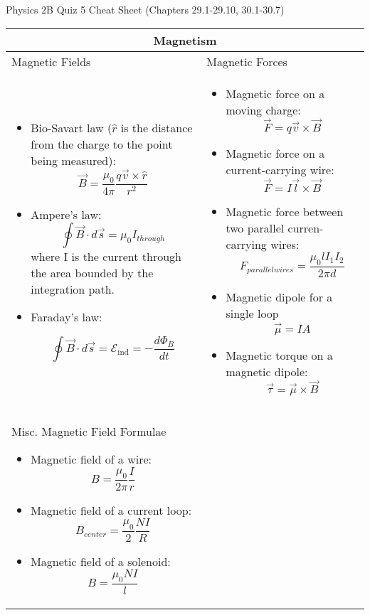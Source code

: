 \documentclass{article}
\begin{document}
\LARGE Physics 2B Quiz 5 Cheat Sheet (Chapters 29.1-29.10, 30.1-30.7)

\hrulefill
\normalsize

\begin{center}
	\begin{tabular}{|p{8cm}|p{8cm}|}
		\hline
		\multicolumn{2}{|c|}{Magnetism}                                                     \\
		\hline

		Magnetic Fields & Magnetic Forces                                                   \\

		\begin{itemize}
			\item Bio-Savart law ($ \hat{r}$ is the distance from the charge to the point being measured):
			      \[ \vec{B} = \frac{\mu_0}{4\pi} \frac{q\vec{v} \times \hat{r}}{r^2} \]
			\item Ampere's law:
			      \[ \oint \vec{B} \cdot d \vec{s} = \mu_0 I_{through} \]
			      where I is the current through the area bounded by the integration path.

			\item Faraday's law:

			      \[ \oint \vec B \cdot d \vec s = \mathcal{E}_\text{ind} = - \frac{d \Phi_B}{dt} \]
		\end{itemize}

		                &

		\begin{itemize}
			\item Magnetic force on a moving charge:
			      \[ \vec{F} = q\vec{v} \times \vec{B} \]
			\item Magnetic force on a current-carrying wire:
			      \[ \vec{F} = I\vec{l} \times \vec{B} \]
			\item Magnetic force between two parallel curren-carrying wires:
			      \[ F_{parallel wires} = \frac{\mu_0 l I_1 I_2}{2 \pi d}\]
			\item Magnetic dipole for a single loop \[\vec{\mu} = IA\]
			\item Magnetic torque on a magnetic dipole:
			      \[ \vec{\tau} = \vec{\mu} \times \vec{B}\]
		\end{itemize} \\
		\hline

		Misc. Magnetic Field Formulae
		\begin{itemize}
			\item Magnetic field of a wire:
			      \[B = \frac{ \mu_0 }{2\pi} \frac{I}{r}\]
			\item Magnetic field of a current loop:
			      \[B_{center} = \frac{ \mu_0 }{2}\frac{NI}{R}\]
			\item Magnetic field of a solenoid:
			      \[B = \frac{ \mu_0 NI}{l}\]
		\end{itemize}


\end{tabular}
\end{center}
\end{document}
